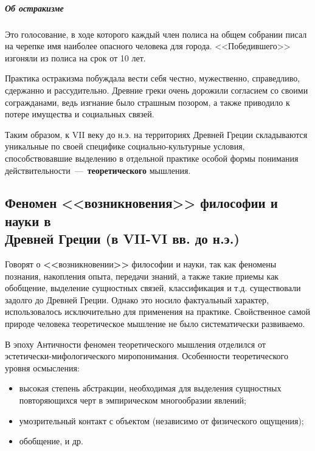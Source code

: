 \subparagraph{Об остракизме} Это голосование, в ходе которого каждый член полиса на общем собрании писал на черепке имя наиболее опасного человека для города. <<Победившего>> изгоняли из полиса на срок от 10 лет. 

Практика остракизма побуждала вести себя честно, мужественно, справедливо, сдержанно и рассудительно. Древние греки очень дорожили согласием со своими согражданами, ведь изгнание было страшным позором, а также приводило к потере имущества и социальных связей.


Таким образом, к VII веку до н.э. на территориях Древней Греции складываются уникальные по своей специфике социально-культурные условия, способствовавшие выделению в отдельной практике особой формы понимания действительности~---~\textbf{теоретического} мышления. 

\subsection{Феномен <<возникновения>> философии и науки в \\ Древней Греции (в VII-VI вв. до н.э.)}

Говорят о \textbf{\Large<<}возникновении\textbf{\Large>>} философии и науки, так как феномены познания, накопления опыта, передачи знаний, а также такие приемы как обобщение, выделение сущностных связей, классификация и т.д. существовали задолго до Древней Греции. 
Однако это носило фактуальный характер, использовалось исключительно для применения на практике. Свойственное самой природе человека теоретическое мышление не было систематически развиваемо.

В эпоху Античности феномен теоретического мышления отделился от эстетически-мифологического миропонимания. Особенности теоретического уровня осмысления: 
\begin{itemize}
    \item высокая степень абстракции, необходимая для выделения сущностных повторяющихся черт в эмпирическом многообразии явлений;
    \item умозрительный контакт с объектом (независимо от физического ощущения);
    \item обобщение, и др.
\end{itemize}

